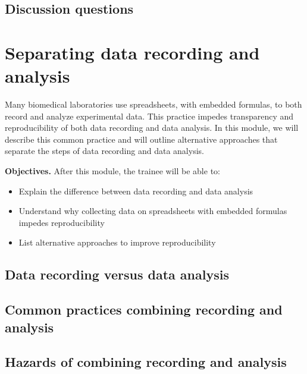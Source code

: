 \documentclass[]{tufte-book}
\providecommand{\tightlist}{%
  \setlength{\itemsep}{0pt}\setlength{\parskip}{0pt}}
\begin{document}
\hypertarget{discussion-questions-5}{%
\subsection{Discussion questions}\label{discussion-questions-5}}

\hypertarget{separating-data-recording-and-analysis-6}{%
\section{Separating data recording and analysis}\label{separating-data-recording-and-analysis-6}}

Many biomedical laboratories use spreadsheets, with embedded formulas, to both
record and analyze experimental data. This practice impedes transparency and
reproducibility of both data recording and data analysis. In this module, we
will describe this common practice and will outline alternative approaches that
separate the steps of data recording and data analysis.

\textbf{Objectives.} After this module, the trainee will be able to:

\begin{itemize}
\tightlist
\item
  Explain the difference between data recording and data analysis
\item
  Understand why collecting data on spreadsheets with embedded formulas impedes
  reproducibility
\item
  List alternative approaches to improve reproducibility
\end{itemize}

\hypertarget{data-recording-versus-data-analysis-6}{%
\subsection{Data recording versus data analysis}\label{data-recording-versus-data-analysis-6}}

\hypertarget{common-practices-combining-recording-and-analysis-6}{%
\subsection{Common practices combining recording and analysis}\label{common-practices-combining-recording-and-analysis-6}}

\hypertarget{hazards-of-combining-recording-and-analysis-6}{%
\subsection{Hazards of combining recording and analysis}\label{hazards-of-combining-recording-and-analysis-6}}
\end{document}
